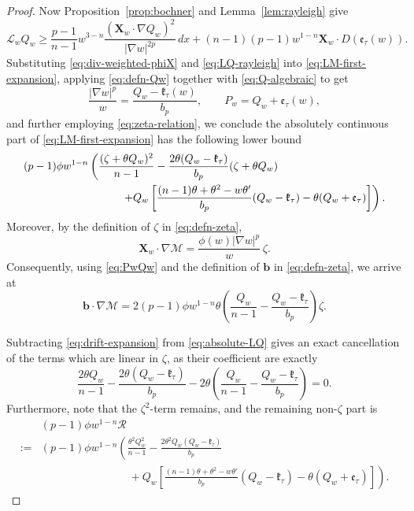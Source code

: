 \documentclass[reqno,12pt]{amsart}
\numberwithin{equation}{section}
\theoremstyle{remark}
\newcommand{\dd}{\,d}
\newcommand{\Xbf}{\mathbf X}
\newcommand{\Lscr}{\mathscr L}
\newcommand{\Mscr}{\mathscr M}
\begin{document}
\begin{proof}
Now Proposition~\ref{prop:bochner} and Lemma~\ref{lem:rayleigh} give
\begin{equation}\label{eq:LQ-rayleigh}
 \Lscr_wQ_w \ge \frac{p-1}{n-1}w^{3-n}
\frac{(\Xbf_w\cdot\nabla Q_w)^2}{|\nabla w|^{2p}}\dd x +(n-1)(p-1)w^{1-n} \Xbf_w\cdot D(\mathfrak e_\tau(w)).
\end{equation} 
Substituting \eqref{eq:div-weighted-phiX} and
\eqref{eq:LQ-rayleigh} into \eqref{eq:LM-first-expansion}, applying \eqref{eq:defn-Qw} together with \eqref{eq:Q-algebraic} to get
\begin{equation}\label{eq:PwQw}
\frac{|\nabla w|^p}{w}=\frac{Q_w-\mathfrak k_\tau(w)}{b_p},
\qquad P_w=Q_w+\mathfrak e_\tau(w),
\end{equation}
and further employing \eqref{eq:zeta-relation},  we conclude the absolutely continuous part of \eqref{eq:LM-first-expansion} has the following lower bound
\begin{align}
 (p-1)\phi w^{1-n}&{}\left( \frac{(\zeta+\theta Q_w)^2}{n-1}
 -\frac{2\theta(Q_w-\mathfrak k_\tau)}{b_p}
  (\zeta+\theta Q_w)\right.\notag\\
 &\left. \qquad\quad +Q_w\left[
 \frac{(n-1)\theta+\theta^2-w\theta'}{b_p}
 (Q_w-\mathfrak k_\tau) -\theta(Q_w+\mathfrak e_\tau)
 \right]\right).\label{eq:absolute-LQ}
\end{align}
Moreover, by the definition of $\zeta$ in \eqref{eq:defn-zeta},
$$
\Xbf_w\cdot\nabla\Mscr =\frac{\phi(w)|\nabla w|^p}{w}\,\zeta.
$$
Consequently, using \eqref{eq:PwQw} and the definition of $\mathbf b$ in \eqref{eq:defn-zeta}, we arrive at
\begin{equation}\label{eq:drift-expansion}
\mathbf b\cdot\nabla\Mscr= 2(p-1)\phi w^{1-n}\theta
\left( \frac{Q_w}{n-1} -\frac{Q_w-\mathfrak k_\tau}{b_p}\right)\zeta.
\end{equation}
 


Subtracting \eqref{eq:drift-expansion} from \eqref{eq:absolute-LQ} gives an exact  cancellation of the terms which are linear in $\zeta$, as their coefficient are exactly
$$
 \frac{2\theta Q_w}{n-1}  -\frac{2\theta(Q_w-\mathfrak k_\tau)}{b_p}
 -2\theta\left( \frac{Q_w}{n-1} -\frac{Q_w-\mathfrak k_\tau}{b_p}\right)=0.
$$
Furthermore, note that the $\zeta^2$-term remains, and the remaining non-$\zeta$ part is
\begin{align*}
&(p-1) \phi w^{1-n}\mathcal R\\
:={}&
(p-1) \phi w^{1-n}\left( \frac{\theta^2Q_w^2}{n-1}
 -\frac{2\theta^2Q_w(Q_w-\mathfrak k_\tau)}{b_p}\right.\\
&\left. \qquad \qquad \qquad \qquad +Q_w\left[
 \frac{(n-1)\theta+\theta^2-w\theta'}{b_p}(Q_w-\mathfrak k_\tau) -\theta(Q_w+\mathfrak e_\tau)
 \right]\right).
\end{align*}


\end{proof}
\end{document}
